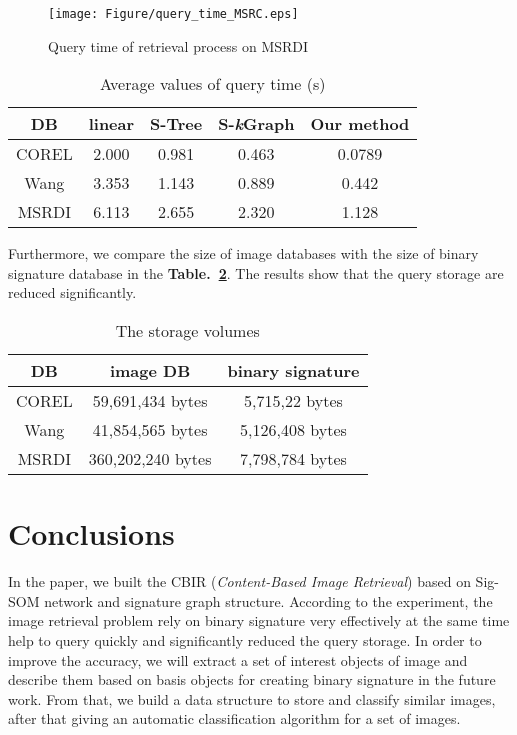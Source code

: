 \documentclass{amcs}
\begin{document}
\begin{figure}[!ht]
	\centering
		\texttt{[image: Figure/query\_time\_MSRC.eps]}
		\caption{Query time of retrieval process on MSRDI}
		\label{fig:MSRCtime}
\end{figure}

\begin{table}[!b]
 \centering
 \caption{Average values of query time (s)}
 \label{table8}
 \begin{tabular}{|c|c|c|c|c|}
   \hline
   DB & linear & S-Tree & S-\textit{k}Graph  & Our method\\\hline\hline
   COREL 		& 2.000 & 0.981 & 0.463 & 0.0789\\
   Wang 	& 3.353 & 1.143 & 0.889 & 0.442\\
   MSRDI 	& 6.113 & 2.655 & 2.320 & 1.128\\\hline
 \end{tabular}
\end{table}

Furthermore, we compare the size of image databases with the size of binary signature database in the \textbf{Table.~\ref{table9}}. The results show that the query storage are reduced significantly.
\begin{table}[!b]
 \centering
 \caption{The storage volumes}
 \label{table9}
 \begin{tabular}{|c|c|c|}
   \hline
   DB & image DB & binary signature \\\hline\hline
   COREL 	& 59,691,434 bytes  & 5,715,22 bytes\\
   Wang 	& 41,854,565 bytes  & 5,126,408 bytes\\
   MSRDI 	& 360,202,240 bytes & 7,798,784 bytes\\\hline
 \end{tabular}
\end{table}

\section{Conclusions}
\label{Conclusions}
In the paper, we built the CBIR (\textit{Content-Based Image Retrieval}) based on Sig-SOM network and signature graph structure. According to the experiment, the image retrieval problem rely on binary signature very effectively at the same time help to query quickly and significantly reduced the query storage. In order to improve the accuracy, we will extract a set of interest objects of image and describe them based on basis objects for creating binary signature in the future work. From that, we build a data structure to store and classify similar images, after that giving an automatic classification algorithm for a set of images.
\end{document}
